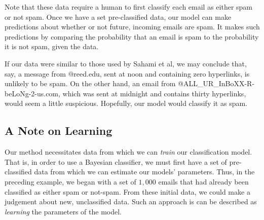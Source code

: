 Note that these data require a human to first classify each email as either spam or not spam. Once we have a set pre-classified data, our model can make predictions about whether or not future, incoming emails are spam. It makes such predictions by comparing the probability that an email is spam to the probability it is not spam, given the data. 

If our data were similar to those used by Sahami et al, we may conclude that, say, a message from @reed.edu, sent at noon and containing zero hyperlinks, is unlikely to be spam. On the other hand, an email from @ALL\_UR\_InBoXX-R-beLoNg-2-us.com, which was sent at midnight and contains thirty hyperlinks, would seem a little suspicious. Hopefully, our model would classify it as spam.
	
	\subsection*{A Note on Learning}
	Our method necessitates data from which we can {\em train} our classification model. That is, in order to use a Bayesian classifier, we must first have a set of pre-classified data from which we can estimate our models' parameters. Thus, in the preceding example, we began with a set of $1,000$ emails that had already been classified as either spam or not-spam. From these initial data, we could make a judgement about new, unclassified data. Such an approach is can be described as {\em learning} the parameters of the model.
	